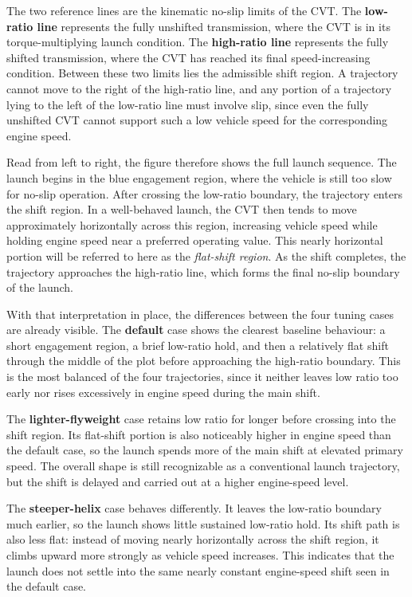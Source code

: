 \documentclass[11pt]{article}
\numberwithin{equation}{section}
\begin{document}
The two reference lines are the kinematic no-slip limits of the CVT. The
\textbf{low-ratio line} represents the fully unshifted transmission, where the
CVT is in its torque-multiplying launch condition. The \textbf{high-ratio line}
represents the fully shifted transmission, where the CVT has reached its final
speed-increasing condition. Between these two limits lies the admissible shift 
region. A trajectory cannot move to the right of the high-ratio
line, and any portion of a trajectory lying to the left of the low-ratio line
must involve slip, since even the fully unshifted CVT cannot support such a low
vehicle speed for the corresponding engine speed.

Read from left to right, the figure therefore shows the full launch sequence.
The launch begins in the blue engagement region, where the vehicle is still too
slow for no-slip operation. After crossing the low-ratio boundary, the
trajectory enters the shift region. In a well-behaved launch, the CVT
then tends to move approximately horizontally across this region, increasing
vehicle speed while holding engine speed near a preferred operating value. This
nearly horizontal portion will be referred to here as the
\emph{flat-shift region}. As the shift completes, the trajectory approaches the
high-ratio line, which forms the final no-slip boundary of the launch.

With that interpretation in place, the differences between the four tuning
cases are already visible. The \textbf{default} case shows the clearest
baseline behaviour: a short engagement region, a brief low-ratio hold, and then
a relatively flat shift through the middle of the plot before approaching the
high-ratio boundary. This is the most balanced of the four trajectories, since
it neither leaves low ratio too early nor rises excessively in engine speed
during the main shift.

The \textbf{lighter-flyweight} case retains low ratio for longer before
crossing into the shift region. Its flat-shift portion is also noticeably
higher in engine speed than the default case, so the launch spends more of the
main shift at elevated primary speed. The overall shape is still recognizable
as a conventional launch trajectory, but the shift is delayed and carried out
at a higher engine-speed level.

The \textbf{steeper-helix} case behaves differently. It leaves the low-ratio
boundary much earlier, so the launch shows little sustained low-ratio hold.
Its shift path is also less flat: instead of moving nearly horizontally across
the shift region, it climbs upward more strongly as vehicle speed increases.
This indicates that the launch does not settle into the same nearly constant
engine-speed shift seen in the default case.
\end{document}
